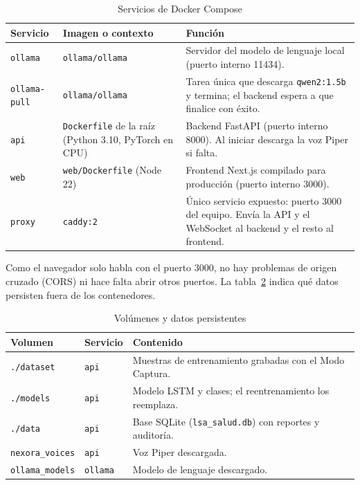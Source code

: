 \begin{table}[H]
  \centering
  \caption{Servicios de Docker Compose}\label{tab:servicios-compose}
  \small
  \begin{tabularx}{\textwidth}{>{\raggedright\arraybackslash}p{2.4cm} >{\raggedright\arraybackslash}p{3.6cm} X}
    \toprule
    \textbf{Servicio} & \textbf{Imagen o contexto} & \textbf{Función} \\
    \midrule
    \texttt{ollama} & \texttt{ollama/ollama} & Servidor del modelo de lenguaje local (puerto interno 11434). \\
    \texttt{ollama-pull} & \texttt{ollama/ollama} & Tarea única que descarga \texttt{qwen2:1.5b} y termina; el backend espera a que finalice con éxito. \\
    \texttt{api} & \texttt{Dockerfile} de la raíz (Python 3.10, PyTorch en CPU) & Backend FastAPI (puerto interno 8000). Al iniciar descarga la voz Piper si falta. \\
    \texttt{web} & \texttt{web/Dockerfile} (Node 22) & Frontend Next.js compilado para producción (puerto interno 3000). \\
    \texttt{proxy} & \texttt{caddy:2} & Único servicio expuesto: puerto 3000 del equipo. Envía la API y el WebSocket al backend y el resto al frontend. \\
    \bottomrule
  \end{tabularx}
\end{table}

Como el navegador solo habla con el puerto 3000, no hay problemas de origen cruzado (CORS) ni hace falta abrir otros puertos. La tabla~\ref{tab:volumenes} indica qué datos persisten fuera de los contenedores.

\begin{table}[H]
  \centering
  \caption{Volúmenes y datos persistentes}\label{tab:volumenes}
  \small
  \begin{tabularx}{\textwidth}{>{\raggedright\arraybackslash}p{4.4cm} >{\raggedright\arraybackslash}p{2.6cm} X}
    \toprule
    \textbf{Volumen} & \textbf{Servicio} & \textbf{Contenido} \\
    \midrule
    \texttt{./dataset} & \texttt{api} & Muestras de entrenamiento grabadas con el Modo Captura. \\
    \texttt{./models} & \texttt{api} & Modelo LSTM y clases; el reentrenamiento los reemplaza. \\
    \texttt{./data} & \texttt{api} & Base SQLite (\texttt{lsa\_salud.db}) con reportes y auditoría. \\
    \texttt{nexora\_voices} & \texttt{api} & Voz Piper descargada. \\
    \texttt{ollama\_models} & \texttt{ollama} & Modelo de lenguaje descargado. \\
    \bottomrule
  \end{tabularx}
\end{table}

